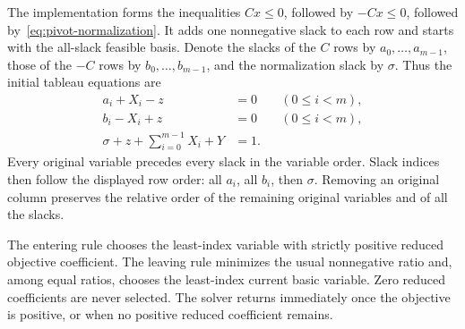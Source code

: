 The implementation forms the inequalities $Cx\le0$, followed by
$-Cx\le0$, followed by~\eqref{eq:pivot-normalization}. It adds one
nonnegative slack to each row and starts with the all-slack feasible basis.
Denote the slacks of the $C$ rows by $a_0,\ldots,a_{m-1}$, those of the
$-C$ rows by $b_0,\ldots,b_{m-1}$, and the normalization slack by $\sigma$.
Thus the initial tableau equations are
\begin{align}
 a_i+X_i-z&=0 &&(0\le i<m),\label{eq:pivot-initial-plus}\\
 b_i-X_i+z&=0 &&(0\le i<m),\label{eq:pivot-initial-minus}\\
 \sigma+z+\sum_{i=0}^{m-1}X_i+Y&=1.\label{eq:pivot-initial-sum}
\end{align}
Every original variable precedes every slack in the variable order.
Slack indices then follow the displayed row order: all $a_i$, all $b_i$,
then $\sigma$. Removing an original column preserves the relative order
of the remaining original variables and of all the slacks.

The entering rule chooses the least-index variable with strictly positive
reduced objective coefficient. The leaving rule minimizes the usual
nonnegative ratio and, among equal ratios, chooses the least-index current
basic variable. Zero reduced coefficients are never selected. The solver
returns immediately once the objective is positive, or when no positive
reduced coefficient remains.

